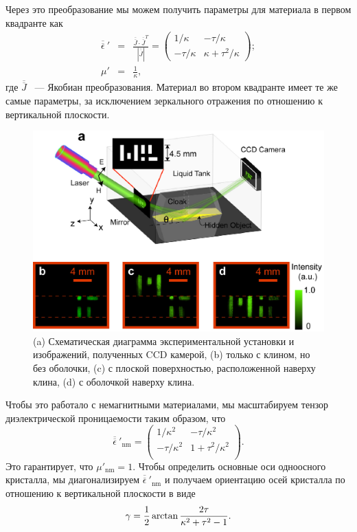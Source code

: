 \documentclass[a4paper, 12pt]{article}
\begin{document}
Через это преобразование мы можем получить параметры для
материала в первом квадранте как
\begin{eqnarray}
\overline{\overline{\epsilon}}\:{}' & =  & \frac{\overline{\overline J} \cdot \overline{\overline{J}}^{T}}{|\overline{\overline J}|} = \left( \begin{array}{cc} 1/\kappa & -\tau /\kappa   \\
-\tau /\kappa & \kappa +\tau^2/\kappa
\end{array} \right); \\ 
\mu' & = & \frac{1}{\kappa},
\end{eqnarray}
где $\overline{\overline J}$ ~--- Якобиан преобразования. Материал во втором
квадранте имеет те же самые параметры, за исключением зеркального отражения 
по отношению к вертикальной плоскости.

\begin{figure}
\begin{centering}
\includegraphics[width=0.7\columnwidth,draft=false]{Fig_3}
\caption{\label{fig:green} (a) Схематическая диаграмма экспериментальной
установки и изображений, полученных CCD камерой, (b) только с клином, но без
оболочки, (c) с плоской поверхностью, расположенной наверху клина, 
(d) с оболочкой наверху клина. }
\end{centering}
\end{figure}

Чтобы это работало с немагнитными материалами, мы масштабируем тензор
диэлектрической проницаемости таким образом, что
\begin{equation}
\overline{\overline{\epsilon}}\:{}'{}_{\text{nm}} = \left( \begin{array}{cc} 1/\kappa^2 & -\tau /\kappa^2\\
-\tau /\kappa^2 & 1 +\tau^2/\kappa^2\\
\end{array} \right).
\end{equation}
Это гарантирует, что $\mu'{}_{\text{nm}}=1$. Чтобы определить основные оси 
одноосного кристалла, мы диагонализируем 
$\overline{\overline{\epsilon}}\:{}'{}_{\text{nm}}$ и получаем ориентацию
осей кристалла по отношению к вертикальной плоскости в виде
\begin{equation}
\gamma = {1\over 2} \arctan \frac{2 \tau}{\kappa^2 + \tau^2 -1} \label{eq:gamma}.
\end{equation}
\end{document}
